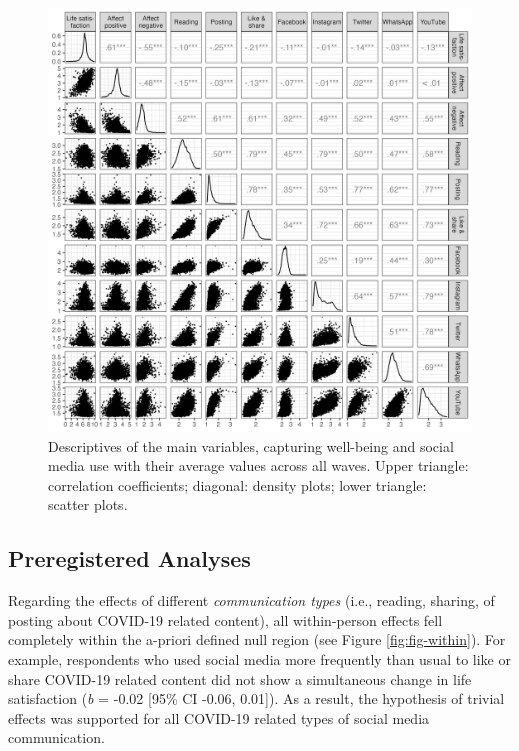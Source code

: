 \documentclass[
  man,mask,floatsintext]{apa7}
\begin{document}
\begin{figure}
\includegraphics[width=\textwidth]{figures/fig_cor} \caption{Descriptives of the main variables, capturing well-being and social media use with their average values across all waves. Upper triangle: correlation coefficients; diagonal: density plots; lower triangle: scatter plots.}\label{fig:fig-correlations}
\end{figure}

\subsection{Preregistered Analyses}\label{preregistered-analyses}

Regarding the effects of different \emph{communication types} (i.e., reading, sharing, of posting about COVID-19 related content), all within-person effects fell completely within the a-priori defined null region (see Figure \ref{fig:fig-within}).
For example, respondents who used social media more frequently than usual to like or share COVID-19 related content did not show a simultaneous change in life satisfaction (\emph{b} = -0.02 {[}95\% CI -0.06, 0.01{]}).
As a result, the hypothesis of trivial effects was supported for all COVID-19 related types of social media communication.
\end{document}
